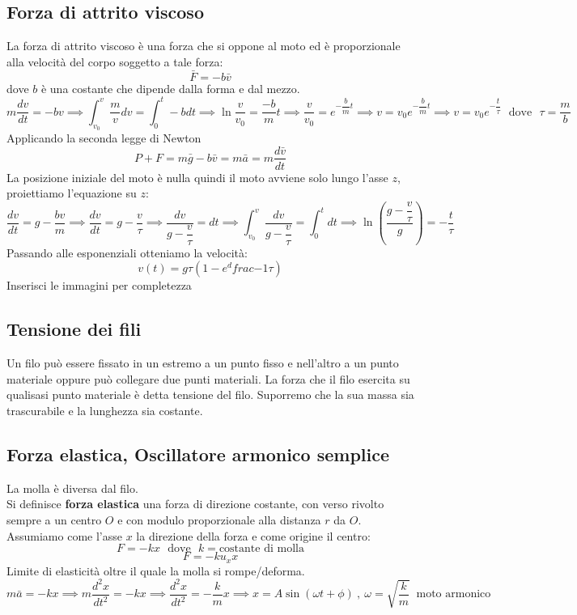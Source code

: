 \documentclass[../../main.tex]{subfiles}
\begin{document}
\subsection{Forza di attrito viscoso}
La forza di attrito viscoso è una forza che si oppone al moto ed è proporzionale alla velocità del corpo soggetto a tale forza:
\[
    \bar F = -b\bar v
\]
dove $b$ è una costante che dipende dalla forma e dal mezzo.
\[
    m\dfrac{dv}{dt} = -b v \implies \int_{v_0}^{v}\dfrac{m}{v} dv = \int_{0}^{t} -b dt \implies \ln\dfrac{v}{v_0} = \dfrac{-b}{m}t \implies \dfrac{v}{v_0} = e^{-\dfrac{b}{m}t} \implies v = v_0 e^{-\dfrac{b}{m}t} \implies v = v_0 e^{-\dfrac{t}{\tau}} \ \ \ \text{dove} \ \ \ \tau = \dfrac{m}{b}
\]
Applicando la seconda legge di Newton
\[
    P + F = m\bar g - b\bar v = m\bar a = m\dfrac{d\bar v}{dt}
\]
La posizione iniziale del moto è nulla quindi il moto avviene solo lungo l'asse $z$, proiettiamo l'equazione su $z$:
\[
    \dfrac{dv}{dt} = g - \dfrac{bv}{m} \implies \dfrac{dv}{dt} = g - \dfrac{v}{\tau} \implies \dfrac{dv}{g - \dfrac{v}{\tau}} = dt \implies \int_{v_0}^{v} \dfrac{dv}{g - \dfrac{v}{\tau}} = \int_{0}^{t} dt \implies \ln\left(\dfrac{g- \dfrac{v}{\tau}}{g}\right) = -\dfrac{t}{\tau}
\]
Passando alle esponenziali otteniamo la velocità:
\[
    v(t) = g\tau\left(1-e^dfrac{-1}{\tau}\right)
\]
Inserisci le immagini per completezza
\subsection{Tensione dei fili}
Un filo può essere fissato in un estremo a un punto fisso e nell’altro a un punto materiale oppure può collegare due punti materiali. La forza che il filo esercita su qualisasi punto materiale è detta tensione del filo. Suporremo che la sua massa sia trascurabile e la lunghezza sia costante.

\subsection{Forza elastica, Oscillatore armonico semplice}
La molla è diversa dal filo. \\
Si definisce \textbf{forza elastica} una forza di direzione costante, con verso rivolto sempre a un centro $O$ e con modulo proporzionale alla distanza $r$ da $O$. Assumiamo come l'asse $x$ la direzione della forza e come origine il centro:
\[
    F = -kx \ \ \ \text{dove} \ \ \ k = \text{costante di molla}
\]
\[
    F = -ku_xx
\]
Limite di elasticità oltre il quale la molla si rompe/deforma.
\[
    m\bar a = -kx \implies m\dfrac{d^2x}{dt^2} = -kx \implies \dfrac{d^2x}{dt^2} = - \dfrac{k}{m}x \implies x = A\sin(\omega t + \phi) \ , \ \omega = \sqrt{\dfrac{k}{m}} \ \text{ moto armonico}
\]
\end{document}
